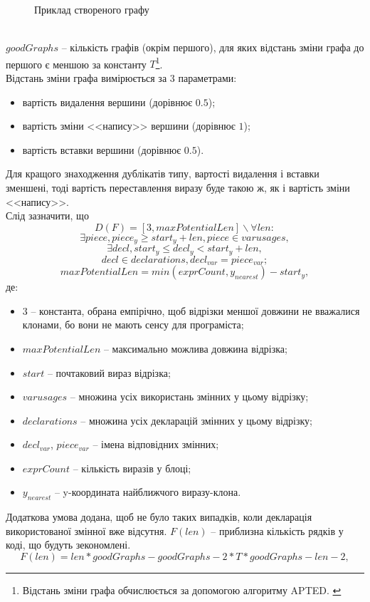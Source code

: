 \documentclass[a4paper, 14pt]{article}
\newcommand{\RNum}[1]{\uppercase\expandafter{\romannumeral #1\relax}}
\begin{document}
\begin{itemize}
{\begin{enumerate}[label={{\arabic*})}]
{\begin{figure}[h]
    \caption{Приклад створеного графу}
    \label{fig:}
\end{figure} \\
$goodGraphs$ -- кількість графів (окрім першого), для яких відстань зміни графа до першого є меншою за константу $T$\footnote{Відстань зміни графа обчислюється за допомогою алгоритму APTED. \cite{Pawlik15}\cite{Pawlik16}}. \\
Відстань зміни графа вимірюється за 3 параметрами: 
\begin{itemize}
\item вартість видалення вершини (дорівнює $0.5$);
\item вартість зміни <<напису>> вершини (дорівнює $1$);
\item вартість вставки вершини (дорівнює $0.5$).
\end{itemize}
Для кращого знаходження дублікатів \RNum{3} типу, вартості видалення і вставки зменшені, 
тоді вартість переставлення виразу буде такою ж, як і вартість зміни <<напису>>.\\
Слід зазначити, що $$D(F)=[3, maxPotentialLen] \backslash \forall len: $$
$$\exists piece, piece_y \geq start_y+len, piece \in varusages, $$
$$\exists decl, start_{y} \leq decl_{y} < start_{y}+len, $$
$$decl \in declarations, decl_{var}=piece_{var};$$
$$maxPotentialLen = min(exprCount, y_{nearest})-start_y,$$ де:
\begin{itemize} 
\item $3$ -- константа, обрана емпірічно, щоб відрізки меншої довжини не вважалися клонами, бо вони не мають сенсу для програміста;
\item $maxPotentialLen$ -- максимально можлива довжина відрізка;
\item $start$ -- почтаковий вираз відрізка;
\item $varusages$ -- множина усіх використань змінних у цьому відрізку;
\item $declarations$ -- множина усіх декларацій змінних у цьому відрізку;
\item $decl_{var}$, $piece_{var}$ -- імена відповідних змінних;
\item $exprCount$ -- кількість виразів у блоці;
\item $y_{nearest}$ -- y-координата найближчого виразу-клона.
\end{itemize}
Додаткова умова додана, щоб не було таких випадків, коли декларація використованої змінної вже відсутня.
$F(len)$ -- приблизна кількість рядків у коді, що будуть зекономлені.
$$F(len) = len*goodGraphs-goodGraphs-2*T*goodGraphs-len-2,$$ 
}
\end{enumerate}}
\end{itemize}
\end{document}
